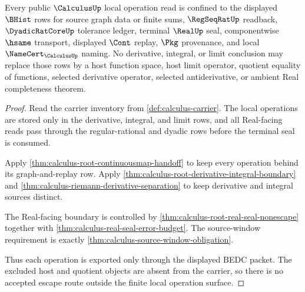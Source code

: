 \begin{theorem}
\label{thm:calculus-local-operation-nonescape}
Every public $\CalculusUp$ local operation read is confined to the displayed $\BHist$ rows for source graph data or finite sums, $\RegSeqRatUp$ readback, $\DyadicRatCoreUp$ tolerance ledger, terminal $\RealUp$ seal, componentwise $\hsame$ transport, displayed $\Cont$ replay, $\Pkg$ provenance, and local $\NameCert_{\CalculusUp}$ naming. No derivative, integral, or limit conclusion may replace those rows by a host function space, host limit operator, quotient equality of functions, selected derivative operator, selected antiderivative, or ambient Real completeness theorem.
\end{theorem}
\begin{proof}
Read the carrier inventory from \autoref{def:calculus-carrier}. The local operations are stored only in the derivative, integral, and limit rows, and all Real-facing reads pass through the regular-rational and dyadic rows before the terminal seal is consumed.

Apply \autoref{thm:calculus-root-continuousmap-handoff} to keep every operation behind its graph-and-replay row. Apply \autoref{thm:calculus-root-derivative-integral-boundary} and \autoref{thm:calculus-riemann-derivative-separation} to keep derivative and integral sources distinct.

The Real-facing boundary is controlled by \autoref{thm:calculus-root-real-seal-nonescape} together with \autoref{thm:calculus-real-seal-error-budget}. The source-window requirement is exactly \autoref{thm:calculus-source-window-obligation}.

Thus each operation is exported only through the displayed BEDC packet. The excluded host and quotient objects are absent from the carrier, so there is no accepted escape route outside the finite local operation surface.
\end{proof}
